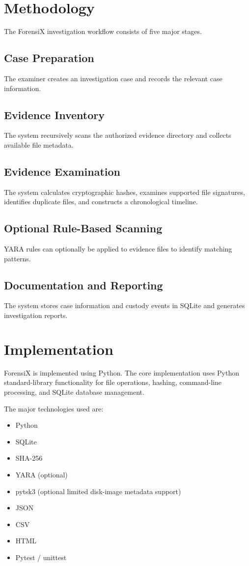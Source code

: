 \documentclass[conference]{IEEEtran}
\begin{document}
\section{Methodology}
The ForensiX investigation workflow consists of five major stages.

\subsection{Case Preparation}
The examiner creates an investigation case and records the relevant case information.

\subsection{Evidence Inventory}
The system recursively scans the authorized evidence directory and collects available file metadata.

\subsection{Evidence Examination}
The system calculates cryptographic hashes, examines supported file signatures, identifies duplicate files, and constructs a chronological timeline.

\subsection{Optional Rule-Based Scanning}
YARA rules can optionally be applied to evidence files to identify matching patterns.

\subsection{Documentation and Reporting}
The system stores case information and custody events in SQLite and generates investigation reports.

\section{Implementation}
ForensiX is implemented using Python. The core implementation uses Python standard-library functionality for file operations, hashing, command-line processing, and SQLite database management.

The major technologies used are:
\begin{itemize}
    \item Python
    \item SQLite
    \item SHA-256
    \item YARA (optional)
    \item pytsk3 (optional limited disk-image metadata support)
    \item JSON
    \item CSV
    \item HTML
    \item Pytest / unittest
\end{itemize}
\end{document}
